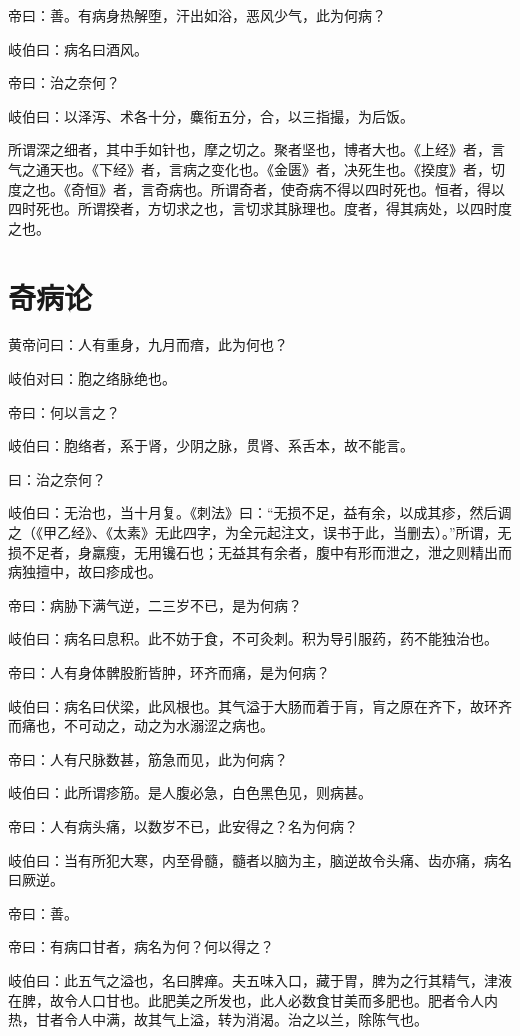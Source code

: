 \documentclass{article}%
\begin{document}
帝曰：善。有病身热解堕，汗出如浴，恶风少气，此为何病？

岐伯曰：病名曰酒风。

帝曰：治之奈何？

岐伯曰：以泽泻、术各十分，麋衔五分，合，以三指撮，为后饭。

所谓深之细者，其中手如针也，摩之切之。聚者坚也，博者大也。《上经》者，言气之通天也。《下经》者，言病之变化也。《金匮》者，决死生也。《揆度》者，切度之也。《奇恒》者，言奇病也。所谓奇者，使奇病不得以四时死也。恒者，得以四时死也。所谓揆者，方切求之也，言切求其脉理也。度者，得其病处，以四时度之也。
\section{奇病论}
黄帝问曰：人有重身，九月而瘖，此为何也？

岐伯对曰：胞之络脉绝也。

帝曰：何以言之？

岐伯曰：胞络者，系于肾，少阴之脉，贯肾、系舌本，故不能言。

曰：治之奈何？

岐伯曰：无治也，当十月复。《刺法》曰：“无损不足，益有余，以成其疹，然后调之（《甲乙经》、《太素》无此四字，为全元起注文，误书于此，当删去）。”所谓，无损不足者，身羸瘦，无用镵石也；无益其有余者，腹中有形而泄之，泄之则精出而病独擅中，故曰疹成也。

帝曰：病胁下满气逆，二三岁不已，是为何病？

岐伯曰：病名曰息积。此不妨于食，不可灸刺。积为导引服药，药不能独治也。

帝曰：人有身体髀股胻皆肿，环齐而痛，是为何病？

岐伯曰：病名曰伏梁，此风根也。其气溢于大肠而着于肓，肓之原在齐下，故环齐而痛也，不可动之，动之为水溺涩之病也。

帝曰：人有尺脉数甚，筋急而见，此为何病？

岐伯曰：此所谓疹筋。是人腹必急，白色黑色见，则病甚。

帝曰：人有病头痛，以数岁不已，此安得之？名为何病？

岐伯曰：当有所犯大寒，内至骨髓，髓者以脑为主，脑逆故令头痛、齿亦痛，病名曰厥逆。

帝曰：善。

帝曰：有病口甘者，病名为何？何以得之？

岐伯曰：此五气之溢也，名曰脾瘅。夫五味入口，藏于胃，脾为之行其精气，津液在脾，故令人口甘也。此肥美之所发也，此人必数食甘美而多肥也。肥者令人内热，甘者令人中满，故其气上溢，转为消渴。治之以兰，除陈气也。
\end{document}
